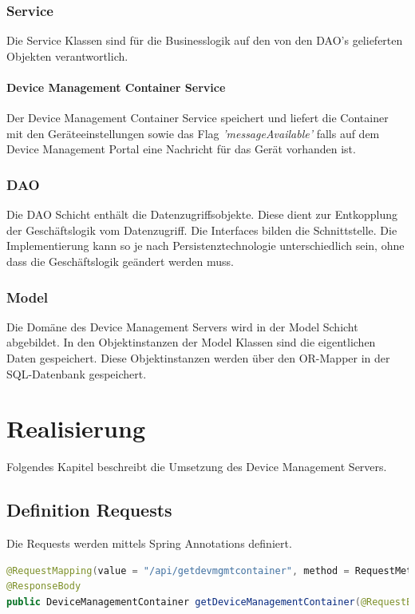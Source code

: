 \subsubsection{Service}
Die Service Klassen sind für die Businesslogik auf den von den DAO's gelieferten Objekten verantwortlich.

\paragraph{Device Management Container Service}
Der Device Management Container Service speichert und liefert die Container mit den Geräteeinstellungen sowie das Flag \textit{'messageAvailable'} falls auf dem Device Management Portal eine Nachricht für das Gerät vorhanden ist.

\subsubsection{DAO}
Die DAO Schicht enthält die Datenzugriffsobjekte. Diese dient zur Entkopplung der Geschäftslogik vom Datenzugriff. Die Interfaces bilden die Schnittstelle. Die Implementierung kann so je nach Persistenztechnologie unterschiedlich sein, ohne dass die Geschäftslogik geändert werden muss.


\subsubsection{Model}
Die Domäne des Device Management Servers wird in der Model Schicht abgebildet. In den Objektinstanzen der Model Klassen sind die eigentlichen Daten gespeichert. Diese Objektinstanzen werden über den OR-Mapper in der SQL-Datenbank gespeichert.

\section{Realisierung}
Folgendes Kapitel beschreibt die Umsetzung des Device Management Servers.

\subsection{Definition Requests}
Die Requests werden mittels Spring Annotations definiert. 

\begin{lstlisting}[language=Java, caption=Spring Annotation]
@RequestMapping(value = "/api/getdevmgmtcontainer", method = RequestMethod.POST)
@ResponseBody
public DeviceManagementContainer getDeviceManagementContainer(@RequestBody final StatusData request)

\end{lstlisting}

